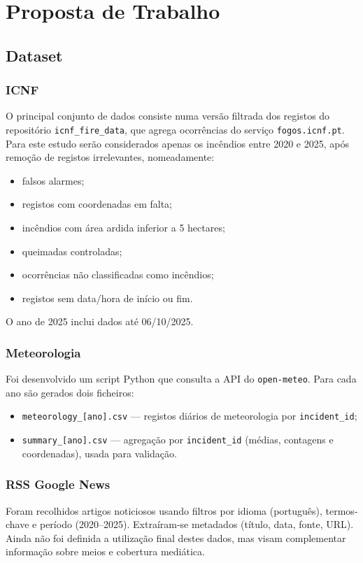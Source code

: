 \section{Proposta de Trabalho}

\subsection{Dataset}

\subsubsection{ICNF}
O principal conjunto de dados consiste numa versão filtrada dos registos do repositório \texttt{icnf\_fire\_data}, que agrega ocorrências do serviço \texttt{fogos.icnf.pt}. Para este estudo serão considerados apenas os incêndios entre 2020 e 2025, após remoção de registos irrelevantes, nomeadamente:
\begin{itemize}
	\item falsos alarmes;
	\item registos com coordenadas em falta;
	\item incêndios com área ardida inferior a 5 hectares;
	\item queimadas controladas;
	\item ocorrências não classificadas como incêndios;
	\item registos sem data/hora de início ou fim.
\end{itemize}

O ano de 2025 inclui dados até 06/10/2025.

\subsubsection{Meteorologia}
Foi desenvolvido um script Python que consulta a API do \texttt{open-meteo}. Para cada ano são gerados dois ficheiros:
\begin{itemize}
	\item \texttt{meteorology\_[ano].csv} — registos diários de meteorologia por \texttt{incident\_id};
	\item \texttt{summary\_[ano].csv} — agregação por \texttt{incident\_id} (médias, contagens e coordenadas), usada para validação.
\end{itemize}

\subsubsection{RSS Google News}
Foram recolhidos artigos noticiosos usando filtros por idioma (português), termos-chave e período (2020–2025). Extraíram-se metadados (título, data, fonte, URL). Ainda não foi definida a utilização final destes dados, mas visam complementar informação sobre meios e cobertura mediática.

